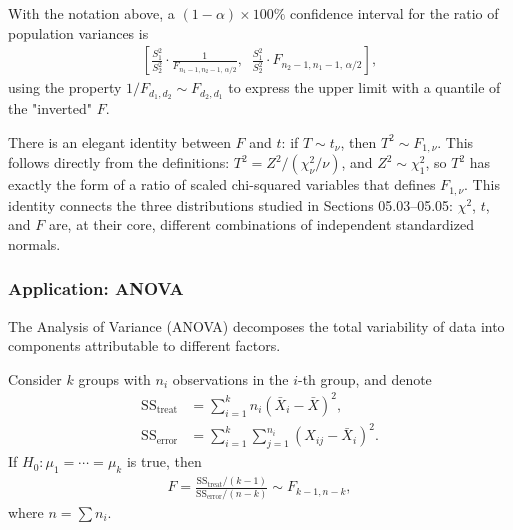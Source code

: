 \begin{teorema}
 \label{eq:5.5.1}
With the notation above, a $(1-\alpha)\times 100\%$ confidence interval for the ratio of population variances is
\begin{align}
 \left[\frac{S_1^2}{S_2^2}\cdot\frac{1}{F_{n_1-1,n_2-1,\,\alpha/2}},\;\;
 \frac{S_1^2}{S_2^2}\cdot F_{n_2-1,n_1-1,\,\alpha/2}\right],
\end{align}
using the property $1/F_{d_1,d_2} \sim F_{d_2,d_1}$ to express the upper limit with a quantile of the "inverted" $F$.
\end{teorema}

\begin{observacion}
There is an elegant identity between $F$ and $t$: if $T \sim t_\nu$, then $T^2 \sim F_{1,\nu}$. This follows directly from the definitions: $T^2 = Z^2/(\chi^2_\nu/\nu)$, and $Z^2 \sim \chi^2_1$, so $T^2$ has exactly the form of a ratio of scaled chi-squared variables that defines $F_{1,\nu}$. This identity connects the three distributions studied in Sections 05.03--05.05: $\chi^2$, $t$, and $F$ are, at their core, different combinations of independent standardized normals.
\end{observacion}

\subsubsection{Application: ANOVA}

The Analysis of Variance (ANOVA) decomposes the total variability of data into components attributable to different factors.

\begin{teorema}
Consider $k$ groups with $n_i$ observations in the $i$-th group, and denote
\begin{align}
 \text{SS}_{\text{treat}} &= \sum_{i=1}^k n_i (\bar{X}_i - \bar{X})^2, \\
 \text{SS}_{\text{error}} &= \sum_{i=1}^k \sum_{j=1}^{n_i} (X_{ij} - \bar{X}_i)^2.
\end{align}
If $H_0: \mu_1 = \cdots = \mu_k$ is true, then
\begin{align}
 \label{eq:3.2.18}
 F = \frac{\text{SS}_{\text{treat}}/(k-1)}{\text{SS}_{\text{error}}/(n-k)} \sim F_{k-1, n-k},
\end{align}
where $n = \sum n_i$.
\end{teorema}

